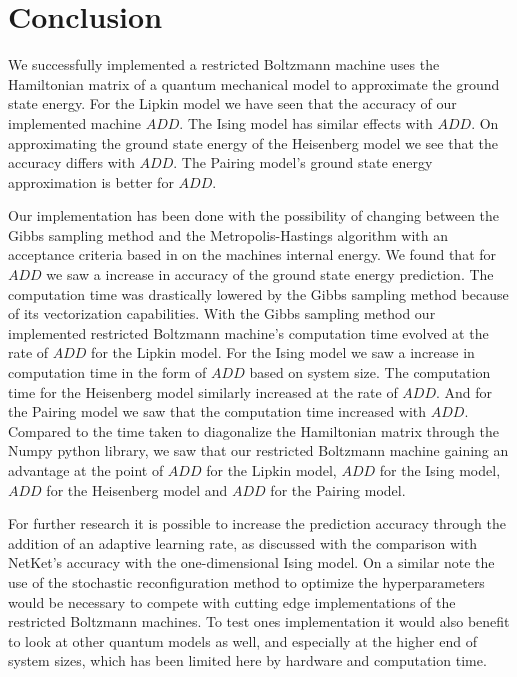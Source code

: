 \chapter{Conclusion}

We successfully implemented a restricted Boltzmann machine uses the Hamiltonian matrix of a quantum mechanical model to approximate the ground state energy. For the Lipkin model we have seen that the accuracy of our implemented machine $ADD$. The Ising model has similar effects with $ADD$. On approximating the ground state energy of the Heisenberg model we see that the accuracy differs with $ADD$. The Pairing model's ground state energy approximation is better for $ADD$. 

Our implementation has been done with the possibility of changing between the Gibbs sampling method and the Metropolis-Hastings algorithm with an acceptance criteria based in on the machines internal energy. We found that for $ADD$ we saw a increase in accuracy of the ground state energy prediction. The computation time was drastically lowered by the Gibbs sampling method because of its vectorization capabilities. With the Gibbs sampling method our implemented restricted Boltzmann machine's computation time evolved at the rate of $ADD$ for the Lipkin model. For the Ising model we saw a increase in computation time in the form of $ADD$ based on system size. The computation time for the Heisenberg model similarly increased at the rate of $ADD$. And for the Pairing model we saw that the computation time increased with $ADD$. Compared to the time taken to diagonalize the Hamiltonian matrix through the Numpy python library, we saw that our restricted Boltzmann machine gaining an advantage at the point of $ADD$ for the Lipkin model, $ADD$ for the Ising model, $ADD$ for the Heisenberg model and $ADD$ for the Pairing model. 

For further research it is possible to increase the prediction accuracy through the addition of an adaptive learning rate, as discussed with the comparison with NetKet's accuracy with the one-dimensional Ising model. On a similar note the use of the stochastic reconfiguration method to optimize the hyperparameters would be necessary to compete with cutting edge implementations of the restricted Boltzmann machines. To test ones implementation it would also benefit to look at other quantum models as well, and especially at the higher end of system sizes, which has been limited here by hardware and computation time.
